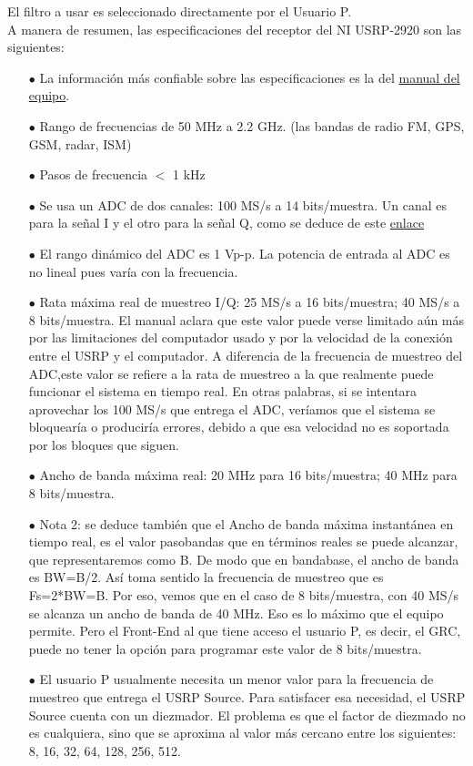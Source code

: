 El filtro a usar es seleccionado directamente por el Usuario P.\\

A manera de resumen, las especificaciones del receptor del NI USRP-2920 son  las siguientes: \\

\begin{itemize}
	\item [$\bullet$] La información más confiable sobre las especificaciones es la del	\textcolor{red}{\href{http://www.ni.com/pdf/manuals/376358a.pdf}{manual del equipo}}.
	\item [$\bullet$] Rango de frecuencias de 50 MHz a 2.2 GHz. (las bandas de radio FM, GPS, GSM, radar, ISM)
	\item [$\bullet$] Pasos de frecuencia $<$ 1 kHz
	\item [$\bullet$] Se usa un ADC de dos canales: 100 MS/s a 14 bits/muestra. Un canal es para la señal I y el otro para la señal Q, como se deduce de este \textcolor{red}{\href{http://www.ni.com/white-paper/13881/en/}{enlace}}
	\item [$\bullet$] El rango dinámico del ADC es 1 Vp-p. La potencia de entrada al ADC es no lineal pues varía con la frecuencia.
	\item [$\bullet$] Rata máxima real de muestreo I/Q: 25 MS/s a 16 bits/muestra; 40 MS/s a 8 bits/muestra. El manual aclara que este valor puede verse limitado aún más por las limitaciones del computador usado y por la velocidad de la conexión entre el USRP y el computador. A diferencia de la frecuencia de muestreo del ADC,este valor se refiere a la rata de muestreo a la que realmente puede funcionar el sistema en tiempo real. En otras palabras, si se intentara aprovechar los 100 MS/s que entrega el ADC, veríamos que el sistema se bloquearía o produciría errores, debido a que esa velocidad no es soportada por los bloques que siguen. 
	\item [$\bullet$] Ancho de banda máxima real: 20 MHz para 16 bits/muestra; 40 MHz para 8 bits/muestra.
	\item [$\bullet$] Nota 2: se deduce también que el Ancho de banda máxima instantánea en tiempo real, es el valor pasobandas que en términos reales se puede alcanzar, que representaremos como B. De modo que en bandabase, el ancho de banda es BW=B/2. Así toma sentido la frecuencia de muestreo que es Fs=2*BW=B. Por eso, vemos que en el caso de 8 bits/muestra, con 40 MS/s se alcanza un ancho de banda de 40 MHz. Eso es lo máximo que el equipo permite. Pero el Front-End al que tiene acceso el usuario P, es decir, el GRC, puede no tener la opción para programar este valor de 8 bits/muestra.
	\item [$\bullet$] El usuario P usualmente necesita un menor valor para la frecuencia de muestreo que entrega el USRP Source. Para satisfacer esa necesidad, el USRP Source cuenta con un diezmador. El problema es que el factor de diezmado no es cualquiera, sino que se aproxima al valor más cercano entre los siguientes: 8, 16, 32, 64, 128, 256, 512. 
\end{itemize}


